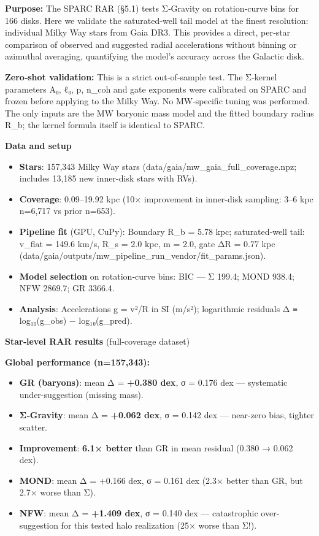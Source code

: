 \documentclass[11pt,a4paper]{article}
\begin{document}
\textbf{Purpose:} The SPARC RAR (§5.1) tests Σ‑Gravity on rotation‑curve bins for 166 disks. Here we validate the saturated‑well tail model at the finest resolution: individual Milky Way stars from Gaia DR3. This provides a direct, per‑star comparison of observed and suggested radial accelerations without binning or azimuthal averaging, quantifying the model's accuracy across the Galactic disk.


\textbf{Zero‑shot validation:} This is a strict out‑of‑sample test. The Σ‑kernel parameters {A₀, ℓ₀, p, n\_coh} and gate exponents were calibrated on SPARC and frozen before applying to the Milky Way. No MW‑specific tuning was performed. The only inputs are the MW baryonic mass model and the fitted boundary radius R\_b; the kernel formula itself is identical to SPARC.


\textbf{Data and setup}

\begin{itemize}
\item \textbf{Stars}: 157,343 Milky Way stars (data/gaia/mw\_gaia\_full\_coverage.npz; includes 13,185 new inner-disk stars with RVs).
\item \textbf{Coverage}: 0.09–19.92 kpc (10× improvement in inner-disk sampling: 3–6 kpc n=6,717 vs prior n=653).
\item \textbf{Pipeline fit} (GPU, CuPy): Boundary R\_b = 5.78 kpc; saturated‑well tail: v\_flat = 149.6 km/s, R\_s = 2.0 kpc, m = 2.0, gate ΔR = 0.77 kpc (data/gaia/outputs/mw\_pipeline\_run\_vendor/fit\_params.json).
\item \textbf{Model selection} on rotation‑curve bins: BIC — Σ 199.4; MOND 938.4; NFW 2869.7; GR 3366.4.
\item \textbf{Analysis}: Accelerations g = v²/R in SI (m/s²); logarithmic residuals Δ ≡ log₁₀(g\_obs) − log₁₀(g\_pred).
\end{itemize}


\textbf{Star‑level RAR results} (full-coverage dataset)


\textbf{Global performance (n=157,343):}

\begin{itemize}
\item \textbf{GR (baryons)}: mean Δ = \textbf{+0.380 dex}, σ = 0.176 dex — systematic under-suggestion (missing mass).
\item \textbf{Σ‑Gravity}: mean Δ = \textbf{+0.062 dex}, σ = 0.142 dex — near-zero bias, tighter scatter.
\item \textbf{Improvement}: \textbf{6.1× better} than GR in mean residual (0.380 → 0.062 dex).
\item \textbf{MOND}: mean Δ = +0.166 dex, σ = 0.161 dex (2.3× better than GR, but 2.7× worse than Σ).
\item \textbf{NFW}: mean Δ = \textbf{+1.409 dex}, σ = 0.140 dex — catastrophic over-suggestion for this tested halo realization (25× worse than Σ!).
\end{itemize}
\end{document}
